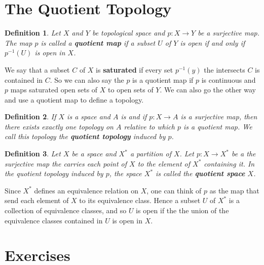 \documentclass{article}
\newtheorem*{definition}{Definition}
\theoremstyle{remark}
\begin{document}
\section{The Quotient Topology}
\begin{definition}
    Let $X$ and $Y$ be topological space and $p:X\to Y$ be a surjective map. 
    The map $p$ is called a \textbf{quotient map} if a subset $U$ of $Y$ is open if and only if $p^{-1}(U)$ is open in $X$.
\end{definition}
We say that a subset $C$ of $X$ is \textbf{saturated} if every set $p^{-1}({y})$ the intersects $C$ is contained in $C$.
So we can also say the $p$ is a quotient map if $p$ is continuous and $p$ maps saturated open sets of $X$ to open sets of $Y$.
We can also go the other way and use a quotient map to define a topology.
\begin{definition}
    If $X$ is a space and $A$ is and if $p:X\to A$ is a surjective map, then there exists exactly one topology on $A$ relative to which $p$ is a quotient map.
    We call this topology the \textbf{quotient topology} induced by $p$.
\end{definition}
\begin{definition}
    Let $X$ be a space and $X^*$ a partition of $X$. Let $p:X\to X^*$ be a the surjective map the carries each point of $X$ to the element of $X^*$ containing it. 
    In the quotient topology induced by $p$, the space $X^*$ is called the \textbf{quotient space} $X$.
\end{definition}
Since $X^*$ defines an equivalence relation on $X$, one can think of $p$ as the map that send each element of $X$ to its equivalence class.
Hence a subset $U$ of $X^*$ is a collection of equivalence classes, and so $U$ is open if the the union of the equivalence classes contained in $U$ is open in $X$.

\newpage
\section{Exercises}

    
\end{document}
